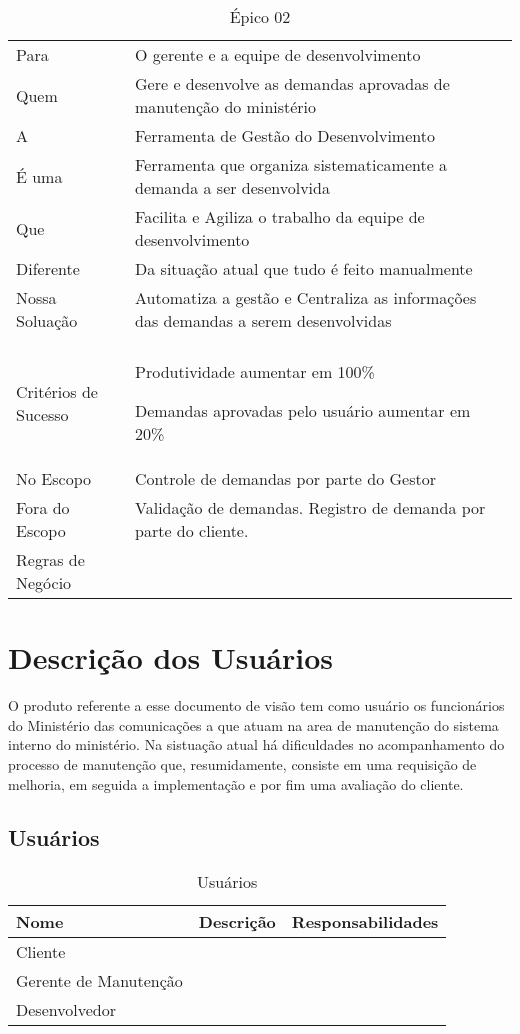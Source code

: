 \begin{table}[H]
	\begin{tabular}{|>{\raggedright}p{4cm}|>{\raggedright}p{10cm}|}
		\hline 
		\multicolumn{2}{|c|}{Caso de Negócio}\tabularnewline
		\hline 
		Para & O gerente e a equipe de desenvolvimento\tabularnewline
		\hline 
		Quem & Gere e desenvolve as demandas aprovadas de manutenção do ministério\tabularnewline
		\hline 
		A & Ferramenta de Gestão do Desenvolvimento\tabularnewline
		\hline 
		É uma & Ferramenta que organiza sistematicamente a demanda a ser desenvolvida\tabularnewline
		\hline 
		Que & Facilita e Agiliza o trabalho da equipe de desenvolvimento\tabularnewline
		\hline 
		Diferente & Da situação atual que tudo é feito manualmente\tabularnewline
		\hline 
		Nossa Soluação & Automatiza a gestão e Centraliza as informações das demandas a serem
		desenvolvidas\tabularnewline
		\hline 
		\multicolumn{2}{|c|}{Escopo}\tabularnewline
		\hline 
		Critérios de Sucesso & Produtividade aumentar em 100\%

		Demandas aprovadas pelo usuário aumentar em 20\%\tabularnewline
		\hline 
		No Escopo & Controle de demandas por parte do Gestor\tabularnewline
		\hline 
		Fora do Escopo & Validação de demandas. Registro de demanda por parte do cliente.\tabularnewline
		\hline 
		Regras de Negócio & \tabularnewline
		\hline
	\end{tabular}
	\caption{Épico 02}
	\label{Epico_02}
\end{table}

\section{Descrição dos Usuários}

O produto referente a esse documento de visão tem como usuário os funcionários do Ministério das comunicações a que atuam na area de manutenção do sistema interno do ministério. Na sistuação atual  há dificuldades no acompanhamento do processo de manutenção que, resumidamente, consiste em uma requisição de melhoria, em seguida a implementação e por fim uma avaliação do cliente. 

\subsection{Usuários}

\begin{table}[H]
	\begin{tabular}{|l| p{7cm} | p{6cm} |}
		\hline
		\textbf{Nome} & \textbf{Descrição} & \textbf{Responsabilidades}\tabularnewline
		\hline
		Cliente & & \tabularnewline
		\hline
		Gerente de Manutenção & & \tabularnewline
		\hline
		Desenvolvedor & & \tabularnewline
		\hline
	\end{tabular}
	\caption{Usuários}
	\label{Usuarios}
\end{table}

